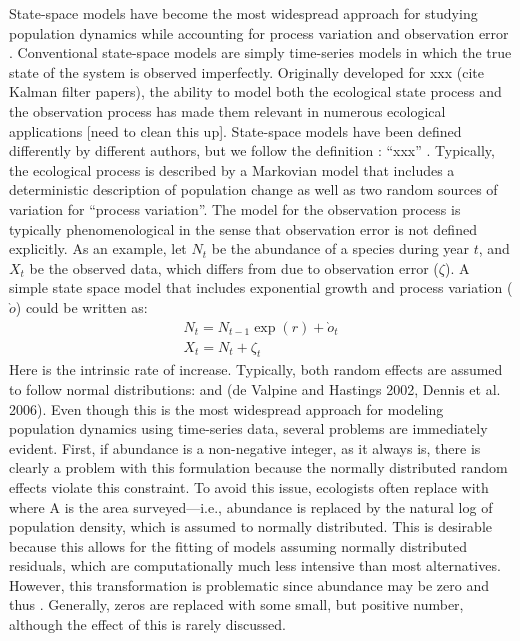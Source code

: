 \documentclass[12pt]{article}
\begin{document}
State-space models have become the most widespread approach for
studying population dynamics while accounting for process variation
and observation error \citep{devalpine_hastings:2002,
  buckland_etal:2004, dennis_taper:1994,
  dennis_etal:2006}. Conventional state-space models are
simply time-series models in which the true state of the system is
observed imperfectly. Originally developed for xxx (cite Kalman filter
papers), the ability to model both the ecological state process and
the observation process has made them relevant in numerous ecological
applications [need to clean this up]. State-space models have been
defined differently by different authors, but we follow
\citet{buckland_etal:2004} the definition : ``xxx'' . Typically, the
ecological
process is described by a Markovian model that includes a
deterministic description of population change as well as two random
sources of variation for ``process variation''. The model for the
observation process is typically phenomenological in the sense that
observation error is not defined explicitly. As an example, let $N_t$ be
the abundance of a species during year $t$, and $X_t$ be the observed data,
which differs from  due to observation error ($\zeta$). A simple state
space model that includes exponential growth and process variation
($\grave{o}$) could be written as:
\begin{gather}
N_t = N_{t-1}\exp(r)+\grave{o}_t \\
X_t = N_t + \zeta_t
\end{gather}
Here   is the intrinsic rate of increase. Typically, both random
effects are assumed to follow normal distributions:   and   (de
Valpine and Hastings 2002, Dennis et al. 2006). Even though this is
the most widespread approach for modeling population dynamics using
time-series data, several problems are immediately evident. First, if
abundance is a non-negative integer, as it always is, there is clearly
a problem with this formulation because the normally distributed
random effects violate this constraint. To avoid this issue,
ecologists often replace   with   where A is the area surveyed---i.e.,
abundance is replaced by the natural log of population density, which
is assumed to normally distributed. This is desirable because this
allows for the fitting of models assuming normally distributed
residuals, which are computationally much less intensive than most
alternatives. However, this transformation is problematic since
abundance may be zero and thus . Generally, zeros are replaced with
some small, but positive number, although the effect of this is rarely
discussed.
\end{document}
